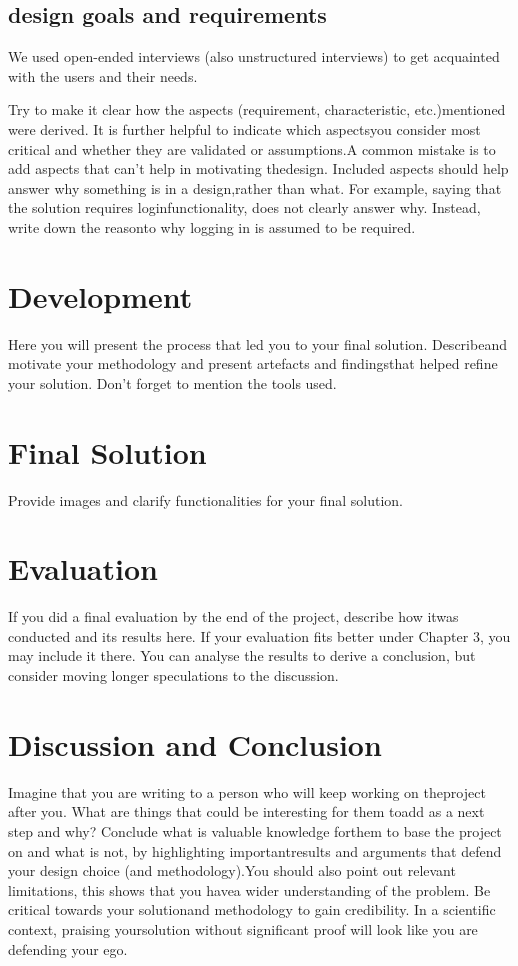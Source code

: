 \documentclass[a4paper, 11pt]{article}
\begin{document}

\subsection{design goals and requirements}

We used open-ended interviews (also unstructured interviews) to get acquainted with the users and their needs.

Try to make it clear how the aspects (requirement, characteristic, etc.)mentioned were derived. It is further helpful to indicate which aspectsyou consider most critical and whether they are validated or assumptions.A common mistake is to add aspects that can't help in motivating thedesign. Included aspects should help answer why something is in a design,rather than what. For example, saying that the solution requires loginfunctionality, does not clearly answer why. Instead, write down the reasonto why logging in is assumed to be required.
\section{Development}
Here you will present the process that led you to your final solution. Describeand motivate your methodology and present artefacts and findingsthat helped refine your solution. Don't forget to mention the tools used.
\section{Final Solution}
Provide images and clarify functionalities for your final solution.
\section{Evaluation}
If you did a final evaluation by the end of the project, describe how itwas conducted and its results here. If your evaluation fits better under Chapter 3, you may include it there. You can analyse the results to derive a conclusion, but consider moving longer speculations to the discussion.
\section{Discussion and Conclusion}
Imagine that you are writing to a person who will keep working on theproject after you. What are things that could be interesting for them toadd as a next step and why? Conclude what is valuable knowledge forthem to base the project on and what is not, by highlighting importantresults and arguments that defend your design choice (and methodology).You should also point out relevant limitations, this shows that you havea wider understanding of the problem. Be critical towards your solutionand methodology to gain credibility. In a scientific context, praising yoursolution without significant proof will look like you are defending your ego.

\end{document}

